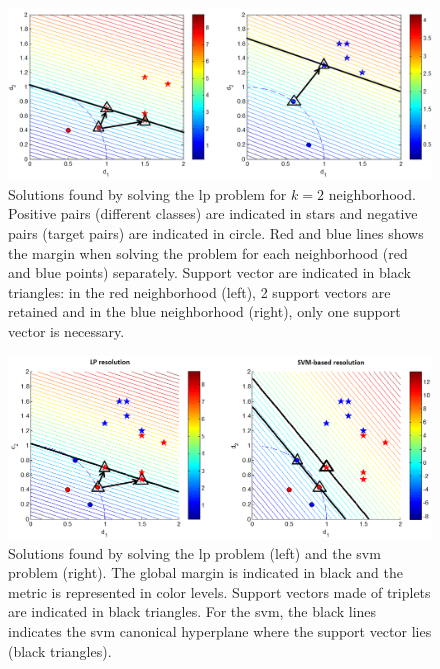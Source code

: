 \begin{figure}[h!]
	\centering
	\begin{minipage}[b]{1\linewidth}
		\centerline{\includegraphics[width=1\linewidth]{images/InterpretationLP}}
	\end{minipage}
	\caption{Solutions found by solving the {\sc lp} problem for $k=2$ neighborhood. Positive pairs (different classes) are indicated in stars and negative pairs (target pairs) are indicated in circle. Red and blue lines shows the margin when solving the problem for each neighborhood (red and blue points) separately. Support vector are indicated in black triangles: in the red neighborhood (left), 2 support vectors are retained and in the blue neighborhood (right), only one support vector is necessary.}
	\label{fig:LP_separate}
\end{figure}

\begin{figure}[h!]
	\centering
	\begin{minipage}[b]{1\linewidth}
		\centerline{\includegraphics[width=1\linewidth]{images/InterpretationLP_SVM}}
	\end{minipage}
	\caption{Solutions found by solving the {\sc lp} problem (left) and the {\sc svm} problem (right). The global margin is indicated in black and the metric is represented in color levels. Support vectors made of triplets are indicated in black triangles. For the {\sc svm}, the black lines indicates the {\sc svm} canonical hyperplane where the support vector lies (black triangles).}
	\label{fig:Linear}
\end{figure}

